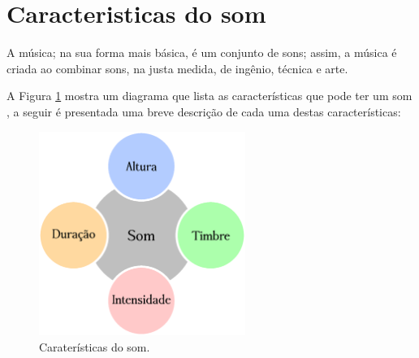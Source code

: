 
\section{Caracteristicas do som}
\label{sec:carateristasom}
A música; na sua forma mais básica,  é um conjunto de sons; assim, 
a música é criada ao combinar sons, na justa medida, de 
ingênio, técnica e arte.

A Figura \ref{fig:carateristicas:som} mostra um diagrama
que lista as características que pode ter um som \cite[pp. 12]{medteoria}, 
a seguir é presentada uma breve descrição de cada uma destas características:
\begin{figure}[!t]
\centering

\includegraphics[width=0.6\textwidth]{chapters/cap-musica-basica/caracteristicas-son-1.eps}
\caption{Caraterísticas do som.}
\label{fig:carateristicas:som}
\end{figure}
